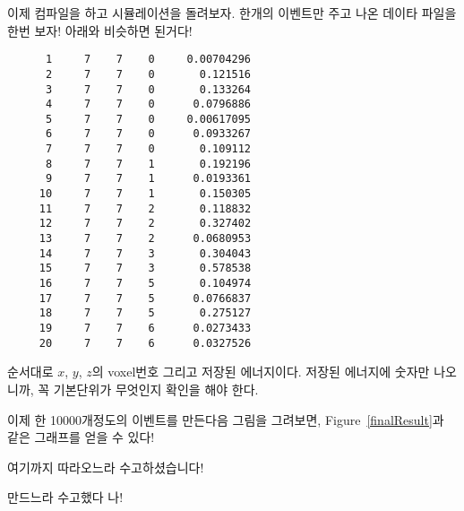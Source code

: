 이제 컴파일을 하고 시뮬레이션을 돌려보자. 한개의 이벤트만 주고
나온 데이타 파일을 한번 보자! 아래와 비슷하면 된거다!
\begin{verbatim}
      1     7    7    0     0.00704296
      2     7    7    0       0.121516
      3     7    7    0       0.133264
      4     7    7    0      0.0796886
      5     7    7    0     0.00617095
      6     7    7    0      0.0933267
      7     7    7    0       0.109112
      8     7    7    1       0.192196
      9     7    7    1      0.0193361
     10     7    7    1       0.150305
     11     7    7    2       0.118832
     12     7    7    2       0.327402
     13     7    7    2      0.0680953
     14     7    7    3       0.304043
     15     7    7    3       0.578538
     16     7    7    5       0.104974
     17     7    7    5      0.0766837
     18     7    7    5       0.275127
     19     7    7    6      0.0273433
     20     7    7    6      0.0327526
\end{verbatim}
순서대로 $x$, $y$, $z$의 voxel번호 그리고 저장된 에너지이다. 저장된 에너지에 숫자만
나오니까, 꼭 기본단위가 무엇인지 확인을 해야 한다.

이제 한 10000개정도의 이벤트를 만든다음 그림을 그려보면, Figure~\ref{finalResult}과
같은 그래프를 얻을 수 있다!

\vspace{5cm}
여기까지 따라오느라 수고하셨습니다!

만드느라 수고했다 나!
